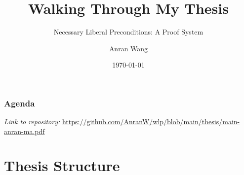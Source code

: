 \documentclass[aspectratio=169]{beamer}
\title{Walking Through My Thesis}
\subtitle{Necessary Liberal Preconditions: A Proof System}
\author{Anran Wang}
\institute{Department of Informatics\\ Technical University of Munich}
\date{\today}
\begin{document}
\begin{frame}
	\titlepage
\end{frame}

\begin{frame}
	\frametitle{Agenda}
	\tableofcontents
	\textit{Link to repository:} {\color{tumblue}\small\url{https://github.com/AnranW/wlp/blob/main/thesis/main-anran-ma.pdf}}
\end{frame}

\section{Thesis Structure}
\end{document}

